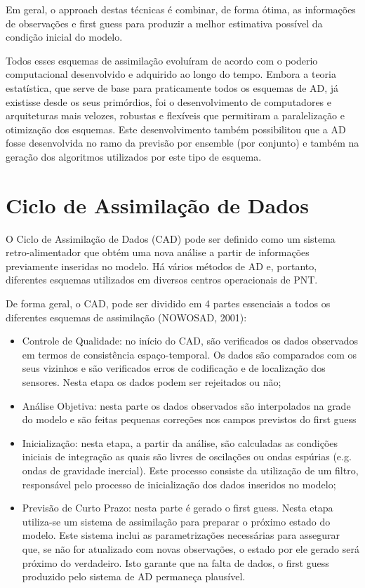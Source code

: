 Em geral, o approach destas técnicas é combinar, de forma ótima, as informações de observações e first guess para produzir a melhor estimativa possível da condição inicial do modelo.

Todos esses esquemas de assimilação evoluíram de acordo com o poderio computacional desenvolvido e adquirido ao longo do tempo. Embora a teoria estatística, que serve de base para praticamente todos os esquemas de AD, já existisse desde os seus primórdios, foi o desenvolvimento de computadores e arquiteturas mais velozes, robustas e flexíveis que permitiram a paralelização e otimização dos esquemas. Este desenvolvimento também possibilitou que a AD fosse desenvolvida no ramo da previsão por ensemble (por conjunto) e também na geração dos algoritmos utilizados por este tipo de esquema.

\section{Ciclo de Assimilação de Dados}
\label{ss:cicloassimdados}

O Ciclo de Assimilação de Dados (CAD) pode ser definido como um sistema retro-alimentador que obtém uma nova análise a partir de informações previamente inseridas no modelo. Há vários métodos de AD e, portanto, diferentes esquemas utilizados em diversos centros operacionais de PNT.

De forma geral, o CAD, pode ser dividido em 4 partes essenciais a todos os diferentes esquemas de assimilação (NOWOSAD, 2001):

\begin{itemize}
\item Controle de Qualidade: no início do CAD, são verificados os dados observados em termos de consistência espaço-temporal. Os dados são comparados com os seus vizinhos e são verificados erros de codificação e de localização dos sensores. Nesta etapa os dados podem ser rejeitados ou não;
\item Análise Objetiva: nesta parte os dados observados são interpolados na grade do modelo e são feitas pequenas correções nos campos previstos do first guess
\item Inicialização: nesta etapa, a partir da análise, são calculadas as condições iniciais de integração as quais são livres de oscilações ou ondas espúrias (e.g. ondas de gravidade inercial). Este processo consiste da utilização de um filtro, responsável pelo processo de inicialização  dos dados inseridos no modelo;
\item Previsão de Curto Prazo: nesta parte é gerado o first guess. Nesta etapa utiliza-se um sistema de assimilação para preparar o próximo estado do modelo. Este sistema inclui as parametrizações necessárias para assegurar que, se não for atualizado com novas observações, o estado por ele gerado será próximo do verdadeiro. Isto garante que na falta de dados, o first guess produzido pelo sistema de AD permaneça plausível.
\end{itemize}

